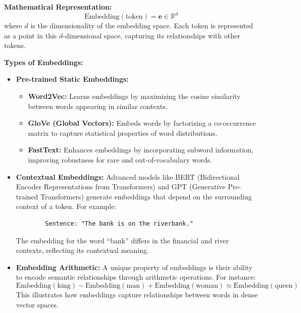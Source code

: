     \textbf{Mathematical Representation:}
    \[
    \text{Embedding}(\text{token}) = \mathbf{e} \in \mathbb{R}^d
    \]
    where \(d\) is the dimensionality of the embedding space. Each token is represented as a point in this \(d\)-dimensional space, capturing its relationships with other tokens. 

    \textbf{Types of Embeddings:}
    \begin{itemize}
        \item \textbf{Pre-trained Static Embeddings:}
        \begin{itemize}
            \item \textbf{Word2Vec:} Learns embeddings by maximizing the cosine similarity between words appearing in similar contexts.
            \item \textbf{GloVe (Global Vectors):} Embeds words by factorizing a co-occurrence matrix to capture statistical properties of word distributions.
            \item \textbf{FastText:} Enhances embeddings by incorporating subword information, improving robustness for rare and out-of-vocabulary words.
        \end{itemize}

        \item \textbf{Contextual Embeddings:} 
        Advanced models like BERT (Bidirectional Encoder Representations from Transformers) and GPT (Generative Pre-trained Transformers) generate embeddings that depend on the surrounding context of a token. For example:
        \begin{verbatim}
        Sentence: "The bank is on the riverbank."
        \end{verbatim}
        The embedding for the word ``bank'' differs in the financial and river contexts, reflecting its contextual meaning.

        \item \textbf{Embedding Arithmetic:}
        A unique property of embeddings is their ability to encode semantic relationships through arithmetic operations. For instance:
        \[
        \text{Embedding}(\text{king}) - \text{Embedding}(\text{man}) + \text{Embedding}(\text{woman}) \approx \text{Embedding}(\text{queen})
        \]
        This illustrates how embeddings capture relationships between words in dense vector spaces.
    \end{itemize}



